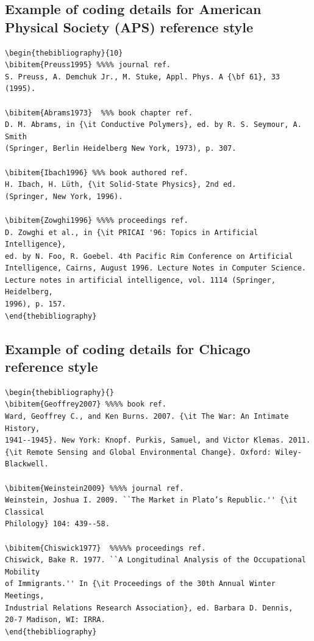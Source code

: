 \documentclass[11pt]{article}
\begin{document}
\subsection{Example of coding details for American Physical Society (APS) reference style}
\begin{verbatim}
\begin{thebibliography}{10}
\bibitem{Preuss1995} %%%% journal ref.
S. Preuss, A. Demchuk Jr., M. Stuke, Appl. Phys. A {\bf 61}, 33 (1995).

\bibitem{Abrams1973}  %%% book chapter ref.
D. M. Abrams, in {\it Conductive Polymers}, ed. by R. S. Seymour, A. Smith
(Springer, Berlin Heidelberg New York, 1973), p. 307.

\bibitem{Ibach1996} %%% book authored ref.
H. Ibach, H. Lüth, {\it Solid-State Physics}, 2nd ed.
(Springer, New York, 1996).

\bibitem{Zowghi1996} %%%% proceedings ref.
D. Zowghi et al., in {\it PRICAI '96: Topics in Artificial Intelligence},
ed. by N. Foo, R. Goebel. 4th Pacific Rim Conference on Artificial
Intelligence, Cairns, August 1996. Lecture Notes in Computer Science.
Lecture notes in artificial intelligence, vol. 1114 (Springer, Heidelberg,
1996), p. 157.
\end{thebibliography}
\end{verbatim}


\subsection{Example of coding details for Chicago reference style}
\begin{verbatim}
\begin{thebibliography}{}
\bibitem{Geoffrey2007} %%%% book ref.
Ward, Geoffrey C., and Ken Burns. 2007. {\it The War: An Intimate History,
1941--1945}. New York: Knopf. Purkis, Samuel, and Victor Klemas. 2011.
{\it Remote Sensing and Global Environmental Change}. Oxford: Wiley-Blackwell.

\bibitem{Weinstein2009} %%%% journal ref.
Weinstein, Joshua I. 2009. ``The Market in Plato’s Republic.'' {\it Classical
Philology} 104: 439--58.

\bibitem{Chiswick1977}  %%%%% proceedings ref.
Chiswick, Bake R. 1977. ``A Longitudinal Analysis of the Occupational Mobility
of Immigrants.'' In {\it Proceedings of the 30th Annual Winter Meetings,
Industrial Relations Research Association}, ed. Barbara D. Dennis,
20-7 Madison, WI: IRRA.
\end{thebibliography}
\end{verbatim}
\end{document}

